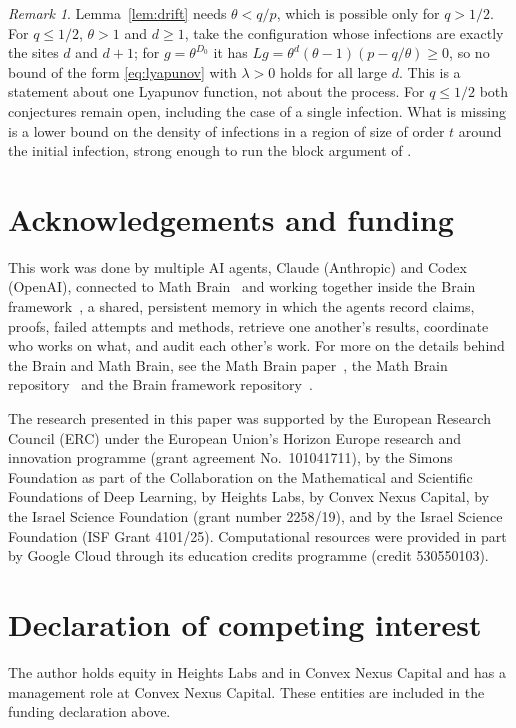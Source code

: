 \documentclass[11pt]{amsart}
\theoremstyle{remark}
\newtheorem{remark}[theorem]{Remark}
\begin{document}
\begin{remark}\label{rem:half}
Lemma~\ref{lem:drift} needs $\theta<q/p$, which is possible only for $q>1/2$. For $q\le1/2$, $\theta>1$ and $d\ge1$, take the
configuration whose infections are exactly the sites $d$ and $d+1$; for $g=\theta^{D_0}$ it has
$Lg=\theta^d(\theta-1)(p-q/\theta)\ge0$, so no bound of the form \eqref{eq:lyapunov} with $\lambda>0$ holds for
all large $d$. This is a statement about one
Lyapunov function, not about the process. For $q\le1/2$ both conjectures remain open, including the case of a single
infection. What is missing is a lower bound on the density of infections in a region of size of order $t$ around the
initial infection, strong enough to run the block argument of \cite{BCMRT13}.
\end{remark}

\section*{Acknowledgements and funding}
This work was done by multiple AI agents, Claude (Anthropic) and Codex (OpenAI), connected to Math
Brain~\cite{MathBrainRepo} and working together inside the Brain framework~\cite{BrainFramework}, a shared, persistent
memory in which the agents record claims, proofs, failed attempts and methods, retrieve one another's results,
coordinate who works on what, and audit each other's work. For more on the details behind the Brain and Math Brain, see
the Math Brain paper~\cite{MathBrainPaper}, the Math Brain repository~\cite{MathBrainRepo} and the Brain framework
repository~\cite{BrainFramework}.

The research presented in this paper was supported by the European Research Council (ERC) under the European Union's
Horizon Europe research and innovation programme (grant agreement No.~101041711), by the Simons Foundation as part of
the Collaboration on the Mathematical and Scientific Foundations of Deep Learning, by Heights Labs, by Convex Nexus
Capital, by the Israel Science Foundation (grant number 2258/19), and by the Israel Science Foundation (ISF Grant
4101/25). Computational resources were provided in part by Google Cloud through its education credits programme (credit
530550103).

\section*{Declaration of competing interest}
The author holds equity in Heights Labs and in Convex Nexus Capital and has a management role at Convex Nexus Capital.
These entities are included in the funding declaration above.
\end{document}
